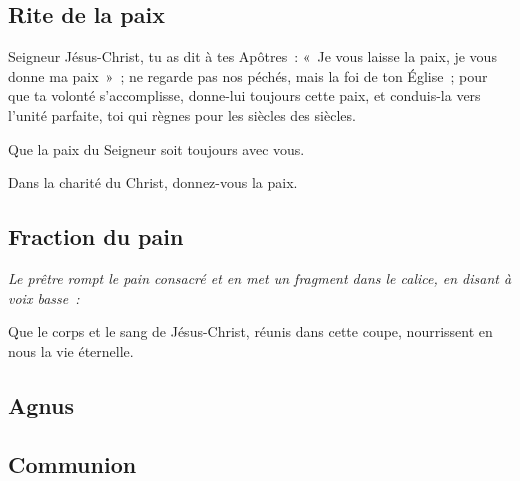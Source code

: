 \subsection*{Rite de la paix}

Seigneur Jésus-Christ, tu as dit à tes Apôtres~: «~Je vous laisse la            
paix, je vous donne ma paix~»~; ne regarde pas nos péchés, mais la
foi de ton Église~; pour que ta volonté s'accomplisse, donne-lui
toujours cette paix, et conduis-la vers l'unité parfaite, toi qui
règnes pour les siècles des siècles.


Que la paix du Seigneur soit toujours avec vous.


Dans la charité du Christ, donnez-vous la paix.


\subsection*{Fraction du pain}

\emph{Le prêtre rompt le pain consacré et en met un fragment dans le            
calice, en disant à voix basse~:}

Que le corps et le sang de Jésus-Christ, réunis dans cette coupe,
nourrissent en nous la vie éternelle.

\subsection*{Agnus}





\subsection*{Communion}

